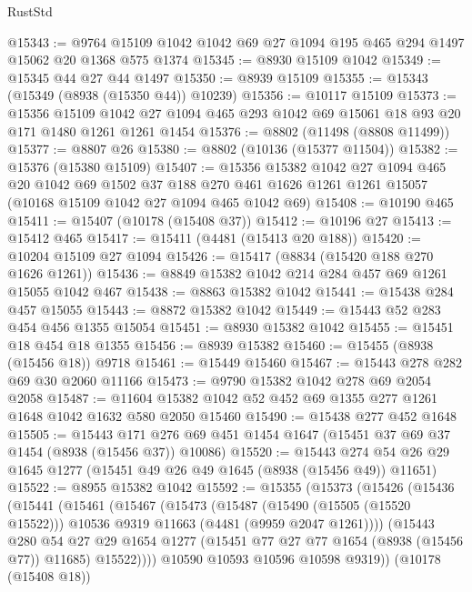 \begin{lexlean}{RustStd}
\begin{coremodule}
@15343 := @9764 @15109 @1042 @1042 @69 @27 @1094 @195 @465 @294 @1497 @15062 @20 @1368 @575 @1374
@15345 := @8930 @15109 @1042
@15349 := @15345 @44 @27 @44 @1497
@15350 := @8939 @15109
@15355 := @15343 (@15349 (@8938 (@15350 @44)) @10239)
@15356 := @10117 @15109
@15373 := @15356
    @15109
    @1042
    @27
    @1094
    @465
    @293
    @1042
    @69
    @15061
    @18
    @93
    @20
    @171
    @1480
    @1261
    @1261
    @1454
@15376 := @8802 (@11498 (@8808 @11499))
@15377 := @8807 @26
@15380 := @8802 (@10136 (@15377 @11504))
@15382 := @15376 (@15380 @15109)
@15407 := @15356
    @15382
    @1042
    @27
    @1094
    @465
    @20
    @1042
    @69
    @1502
    @37
    @188
    @270
    @461
    @1626
    @1261
    @1261
    @15057
    (@10168 @15109 @1042 @27 @1094 @465 @1042 @69)
@15408 := @10190 @465
@15411 := @15407 (@10178 (@15408 @37))
@15412 := @10196 @27
@15413 := @15412 @465
@15417 := @15411 (@4481 (@15413 @20 @188))
@15420 := @10204 @15109 @27 @1094
@15426 := @15417 (@8834 (@15420 @188 @270 @1626 @1261))
@15436 := @8849 @15382 @1042 @214 @284 @457 @69 @1261 @15055 @1042 @467
@15438 := @8863 @15382 @1042
@15441 := @15438 @284 @457 @15055
@15443 := @8872 @15382 @1042
@15449 := @15443 @52 @283 @454 @456 @1355 @15054
@15451 := @8930 @15382 @1042
@15455 := @15451 @18 @454 @18 @1355
@15456 := @8939 @15382
@15460 := @15455 (@8938 (@15456 @18)) @9718
@15461 := @15449 @15460
@15467 := @15443 @278 @282 @69 @30 @2060 @11166
@15473 := @9790 @15382 @1042 @278 @69 @2054 @2058
@15487 := @11604 @15382 @1042 @52 @452 @69 @1355 @277 @1261 @1648 @1042 @1632 @580 @2050 @15460
@15490 := @15438 @277 @452 @1648
@15505 := @15443
    @171
    @276
    @69
    @451
    @1454
    @1647
    (@15451 @37 @69 @37 @1454 (@8938 (@15456 @37)) @10086)
@15520 := @15443 @274 @54 @26 @29 @1645 @1277 (@15451 @49 @26 @49 @1645 (@8938 (@15456 @49)) @11651)
@15522 := @8955 @15382 @1042
@15592 := @15355
    (@15373
      (@15426
        (@15436
          (@15441
            (@15461
              (@15467
                (@15473
                  (@15487
                    (@15490 (@15505 (@15520 @15522)))
                    @10536
                    @9319
                    @11663
                    (@4481 (@9959 @2047 @1261))))
                (@15443
                  @280
                  @54
                  @27
                  @29
                  @1654
                  @1277
                  (@15451 @77 @27 @77 @1654 (@8938 (@15456 @77)) @11685)
                  @15522))))
          @10590
          @10593
          @10596
          @10598
          @9319))
      (@10178 (@15408 @18))

\end{coremodule}
\end{lexlean}
